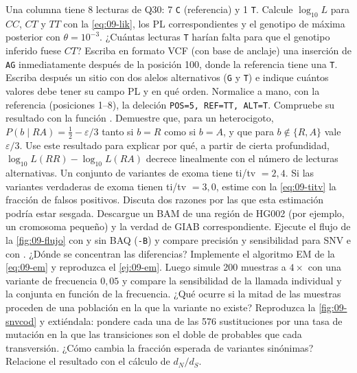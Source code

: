 \begin{ejercicios}
 Una columna tiene 8 lecturas de Q30: 7 \texttt{C} (referencia) y 1 \texttt{T}. Calcule $\log_{10}L$ para $CC$, $CT$ y $TT$ con la \cref{eq:09-lik}, los PL correspondientes y el genotipo de máxima posterior con $\theta=10^{-3}$. ¿Cuántas lecturas \texttt{T} harían falta para que el genotipo inferido fuese $CT$?
 Escriba en formato VCF (con base de anclaje) una inserción de \texttt{AG} inmediatamente después de la posición 100, donde la referencia tiene una \texttt{T}. Escriba después un sitio con dos alelos alternativos (\texttt{G} y \texttt{T}) e indique cuántos valores debe tener su campo PL y en qué orden.
 Normalice a mano, con la referencia  (posiciones 1--8), la deleción \texttt{POS=5, REF=TT, ALT=T}. Compruebe su resultado con la función .
 Demuestre que, para un heterocigoto, $P(b\mid RA)=\tfrac12-\varepsilon/3$ tanto si $b=R$ como si $b=A$, y que para $b\notin\{R,A\}$ vale $\varepsilon/3$. Use este resultado para explicar por qué, a partir de cierta profundidad, $\log_{10}L(RR)-\log_{10}L(RA)$ decrece linealmente con el número de lecturas alternativas.
 Un conjunto de variantes de exoma tiene ti/tv $=2{,}4$. Si las variantes verdaderas de exoma tienen ti/tv $=3{,}0$, estime con la \cref{eq:09-titv} la fracción de falsos positivos. Discuta dos razones por las que esta estimación podría estar sesgada.
 Descargue un BAM de una región de HG002 (por ejemplo, un cromosoma pequeño) y la verdad de GIAB correspondiente. Ejecute el flujo de la \cref{fig:09-flujo} con y sin BAQ (\texttt{-B}) y compare precisión y sensibilidad para SNV e  con . ¿Dónde se concentran las diferencias?
 Implemente el algoritmo EM de la \cref{eq:09-em} y reproduzca el \cref{ej:09-em}. Luego simule 200 muestras a $4\times$ con una variante de frecuencia $0{,}05$ y compare la sensibilidad de la llamada individual y la conjunta en función de la frecuencia. ¿Qué ocurre si la mitad de las muestras proceden de una población en la que la variante no existe?
 Reproduzca la \cref{fig:09-snvcod} y extiéndala: pondere cada una de las 576 sustituciones por una tasa de mutación en la que las transiciones son el doble de probables que cada transversión. ¿Cómo cambia la fracción esperada de variantes sinónimas? Relacione el resultado con el cálculo de $d_N/d_S$.
\end{ejercicios}

